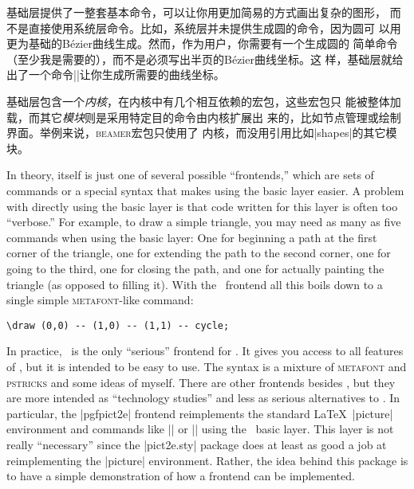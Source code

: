 \begin{description}
  基础层提供了一整套基本命令，可以让你用更加简易的方式画出复杂的图形，
  而不是直接使用系统层命令。比如，系统层并未提供生成圆的命令，因为圆可
  以用更为基础的B\'ezier曲线生成。然而，作为用户，你需要有一个生成圆的
  简单命令（至少我是需要的），而不是必须写出半页的B\'ezier曲线坐标。这
  样，基础层就给出了一个命令|\pgfpathcircle|让你生成所需要的曲线坐标。


  基础层包含一个\emph{内核}，在内核中有几个相互依赖的宏包，这些宏包只
  能被整体加载，而其它\emph{模块}则是采用特定目的命令由内核扩展出
  来的，比如节点管理或绘制界面。举例来说，\textsc{beamer}宏包只使用了
  内核，而没用引用比如|shapes|的其它模块。

\end{description}  

In theory, \tikzname itself is just one of several possible
``frontends,'' which are sets of commands or a special syntax that
makes using the basic layer easier. A problem with directly using the
basic layer is that code written for this layer is often too
``verbose.'' For example, to draw a simple 
triangle, you may need as many as five commands when using the basic
layer: One for beginning a path at the first corner of the triangle,
one for extending the path to the second corner, one for going to
the third, one for closing the path, and one for actually painting
the triangle (as opposed to filling it). With the \tikzname\ frontend
all this boils down to a single simple \textsc{metafont}-like
command:
\begin{verbatim}
\draw (0,0) -- (1,0) -- (1,1) -- cycle;
\end{verbatim}

In practice, \tikzname\ is the only ``serious'' frontend for \pgfname. It
gives you access to all features of \pgfname, but it is intended to be
easy to use. The syntax is a mixture of \textsc{metafont} and
\textsc{pstricks} and some ideas of myself. There are other frontends
besides \tikzname, but they are more intended as ``technology
studies'' and less as serious alternatives to \tikzname. In
particular, the |pgfpict2e| frontend   reimplements the standard
\LaTeX\ |{picture}|  environment and 
commands like |\line| or |\vector| 
using the \pgfname\ basic layer. This layer is not really ``necessary''
since the |pict2e.sty| package does at least as good a job at
reimplementing the |{picture}| environment. Rather, the idea
behind this package is to have a simple demonstration of how a
frontend can be implemented. 

